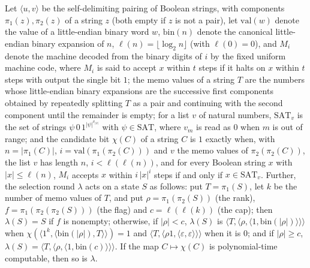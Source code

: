 \begin{theorem}
\label{Complexity.ladner_selectStep_FP}
\leanok
{}
Let $\langle u,v\rangle$ be the self-delimiting pairing of Boolean strings, with components $\pi_1(z),\pi_2(z)$ of a string $z$ (both empty if $z$ is not a pair), let $\mathrm{val}(w)$ denote the value of a little-endian binary word $w$, $\mathrm{bin}(n)$ denote the canonical little-endian binary expansion of $n$, $\ell(n)=\lfloor\log_2 n\rfloor$ (with $\ell(0)=0$), and $M_i$ denote the machine decoded from the binary digits of $i$ by the fixed uniform machine code, where $M_i$ is said to accept $x$ within $t$ steps if it halts on $x$ within $t$ steps with output the single bit $1$; the memo values of a string $T$ are the numbers whose little-endian binary expansions are the successive first components obtained by repeatedly splitting $T$ as a pair and continuing with the second component until the remainder is empty; for a list $v$ of natural numbers, $\mathrm{SAT}_v$ is the set of strings $\psi\,0\,1^{|\psi|^{v_{|\psi|}}}$ with $\psi\in\mathrm{SAT}$, where $v_m$ is read as $0$ when $m$ is out of range; and the candidate bit $\chi(C)$ of a string $C$ is $1$ exactly when, with $n=|\pi_1(C)|$, $i=\mathrm{val}(\pi_1(\pi_2(C)))$ and $v$ the memo values of $\pi_2(\pi_2(C))$, the list $v$ has length $n$, $i<\ell(\ell(n))$, and for every Boolean string $x$ with $|x|\le\ell(n)$, $M_i$ accepts $x$ within $i\,|x|^i$ steps if and only if $x\in\mathrm{SAT}_v$. Further, the selection round $\lambda$ acts on a state $S$ as follows: put $T=\pi_1(S)$, let $k$ be the number of memo values of $T$, and put $\rho=\pi_1(\pi_2(S))$ (the rank), $f=\pi_1(\pi_2(\pi_2(S)))$ (the flag) and $c=\ell(\ell(k))$ (the cap); then $\lambda(S)=S$ if $f$ is nonempty; otherwise, if $|\rho|<c$, $\lambda(S)$ is $\langle T,\langle\rho,\langle 1,\mathrm{bin}(|\rho|)\rangle\rangle\rangle$ when $\chi(\langle 1^{k},\langle\mathrm{bin}(|\rho|),T\rangle\rangle)=1$ and $\langle T,\langle\rho1,\langle\varepsilon,\varepsilon\rangle\rangle\rangle$ when it is $0$; and if $|\rho|\ge c$, $\lambda(S)=\langle T,\langle\rho,\langle 1,\mathrm{bin}(c)\rangle\rangle\rangle$. If the map
$C\mapsto\chi(C)$ is polynomial-time computable, then so is $\lambda$.
\end{theorem}

